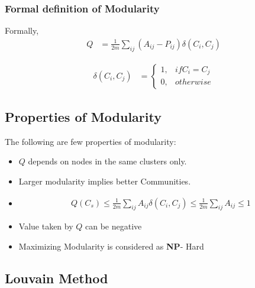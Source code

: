 \documentclass{beamer}
\begin{document}
\frame
{
	\frametitle{Formal definition of Modularity}

\begin{definition}
Formally, 
\begin{equation}
    \begin{split}
Q &= \frac{1}{2m} \sum_{ij} \left(A_{ij} - P_{ij}\right) \delta(C_i,C_j)
\end{split}
    \end{equation}

\begin{equation}
\begin{split}
\delta(C_i,C_j) &= \begin{cases} 1 ,& if C_i = C_j \\
 0,& otherwise
 \end{cases}
\end{split}
\end{equation}

\end{definition}

}
\subsection{Properties of Modularity}
The following are few properties of modularity:
\begin{itemize}
 \item $Q$ depends on nodes in the same clusters only. 
  \item Larger modularity implies better Communities.
    \item 
    \begin{equation}
    \begin{split}
Q(C_s) \leq \frac{1}{2m} \sum_{ij} A_{ij} \delta(C_i,C_j) \leq \frac{1}{2m} \sum_{ij} A_{ij} \leq 1
\end{split}
    \end{equation}
 \item Value taken by $Q$ can be negative
 \item Maximizing Modularity is considered as \textbf{NP}- Hard
 \end{itemize}

\subsection{Louvain Method} 
\end{document}
